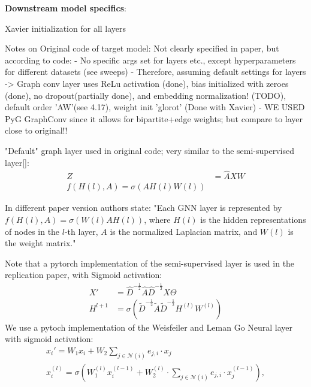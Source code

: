 \textbf{Downstream model specifics}:

Xavier initialization for all layers

Notes on Original code of target model: Not clearly specified in paper, but according to code:
- No specific args set for layers etc., except hyperparameters for different datasets (see sweeps)
- Therefore, assuming default settings for layers -> Graph conv layer uses ReLu activation (done), bias initialized with zeroes (done), no dropout(partially done), and embedding normalization! (TODO), default order 'AW'(see 4.17), weight init 'glorot' (Done with Xavier)
- WE USED PyG GraphConv since it allows for bipartite+edge weights; but compare to layer close to original!!\bigskip

"Default" graph layer used in original code; very similar to the semi-supervised layer\ref{}:
\begin{align}
    Z &= \hat{A}XW \\
    f(H(l),A)=\sigma(AH(l)W(l))
\end{align}

In different paper version authors state:
"Each GNN layer is represented by $f(H(l),A)=\sigma(W(l)AH(l))$, where $H(l)$ is the hidden representations of nodes in the $l$-th layer, $A$ is the normalized Laplacian matrix, and $W(l)$ is the weight matrix."

Note that a pytorch implementation of the semi-supervised layer is used in the replication paper, with Sigmoid activation:
\begin{align}
    X' &= \hat{D}^{-\frac{1}{2}}\hat{A}\hat{D}^{-\frac{1}{2}}X\Theta \\
    H^{l+1} &= \sigma(\tilde{D}^{-\frac{1}{2}}\tilde{A}\tilde{D}^{-\frac{1}{2}}H^{(l)}W^{(l)})
\end{align}
We use a pytoch implementation of the Weisfeiler and Leman Go Neural layer with sigmoid activation:
\begin{align}
    x_i' = W_1x_i+W_2 \sum_{j\in\mathcal{N}(i)}e_{j,i}\cdot x_j \\
    x_i^{(l)} = \sigma(W_1^{(l)}x_i^{(l-1)}+W_2^{(l)}\cdot\sum_{j\in\mathcal{N}(i)}e_{j,i}\cdot x_j^{(l-1)}),
\end{align}


